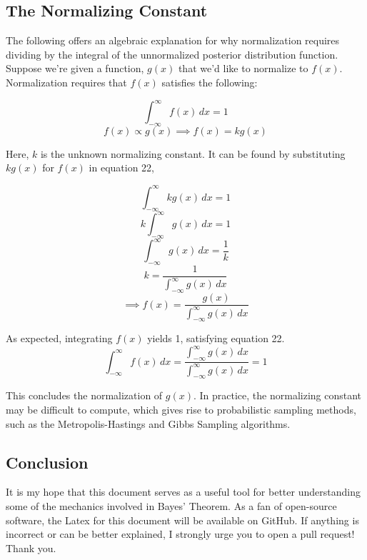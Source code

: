 \documentclass[12pt]{article}
\begin{document}
\subsection*{The Normalizing Constant}
\noindent The following offers an algebraic explanation for why normalization requires dividing by the integral of the unnormalized posterior distribution function. Suppose we're given a function, $g(x)$ that we'd like to normalize to $f(x)$. Normalization requires that $f(x)$ satisfies the following:

\begin{equation}
\int_{-\infty}^{\infty} f(x) \, dx = 1
\end{equation}
\begin{equation}
f(x) \propto g(x) \implies f(x) = k g(x)
\end{equation}

\noindent Here, $k$ is the unknown normalizing constant. It can be found by substituting $kg(x)$ for $f(x)$ in equation 22,

\begin{equation}
\int_{-\infty}^{\infty} kg(x) \, dx = 1
\end{equation}
\begin{equation}
k\int_{-\infty}^{\infty} g(x) \, dx = 1
\end{equation}
\begin{equation}
\int_{-\infty}^{\infty} g(x) \, dx = \frac{1}{k}
\end{equation}
\begin{equation}
k = \frac{1}{\int_{-\infty}^{\infty} g(x) \, dx}
\end{equation}
\begin{equation}
\implies f(x) = \frac{g(x)}{\int_{-\infty}^{\infty} g(x) \, dx}
\end{equation}

\noindent As expected, integrating $f(x)$ yields 1, satisfying equation 22.
\begin{equation}
\int_{-\infty}^{\infty} f(x)\, dx = \frac{\int_{-\infty}^{\infty} g(x) \, dx}{\int_{-\infty}^{\infty} g(x) \, dx} = 1
\end{equation}

\noindent This concludes the normalization of $g(x)$. In practice, the normalizing constant may be difficult to compute, which gives rise to probabilistic sampling methods, such as the Metropolis-Hastings and Gibbs Sampling algorithms.


\subsection*{Conclusion}
\noindent It is my hope that this document serves as a useful tool for better understanding some of the mechanics involved in Bayes' Theorem. As a fan of open-source software, the Latex for this document will be available on GitHub. If anything is incorrect or can be better explained, I strongly urge you to open a pull request! Thank you.
\end{document}

